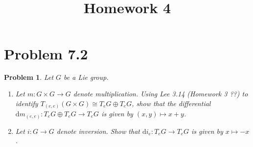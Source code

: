 \documentclass[11pt, letterpaper]{article}
\title{Homework 4}
\theoremstyle{plain}
\newtheorem{problem}{Problem}
\begin{document}
\makeproblem

\section{Problem 7.2}
\begin{problem}\label{1}
	Let $G$ be a Lie group.
	\begin{enumerate}
		\item Let $m : G\times G \to G$ denote multiplication. Using Lee 3.14 (Homework 3 ??) to identify $T_{(e,e)} (G\times G) \cong T_eG \oplus T_eG$, show that the differential $\mathrm{d}m_{(e,e)} : T_eG \oplus T_eG \to T_eG$ is given by $(x,y)\mapsto x+y$.
		\item Let $i : G \to G$ denote inversion. Show that $\mathrm{d} i_e : T_eG \to T_eG$ is given by $x\mapsto -x$.
	\end{enumerate}
\end{problem}
\end{document}

